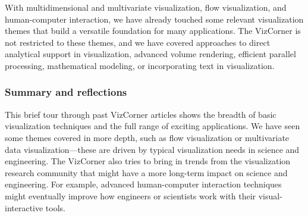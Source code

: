 \documentclass[10pt,journal,compsoc]{IEEEtran}
\begin{document}
With multidimensional and multivariate visualization, flow visualization, and human-computer interaction, we have already touched some relevant visualization themes that build a versatile foundation for many applications. The VizCorner is not restricted to these themes, and we have covered approaches to direct analytical support in visualization, advanced volume rendering, efficient parallel processing, mathematical modeling, or incorporating text in visualization.  %





\subsubsection*{Summary and reflections}

This brief tour through past VizCorner articles shows the breadth of basic visualization techniques and the full range of exciting applications. We have seen some themes covered in more depth, such as flow visualization or multivariate data visualization---these are driven by typical visualization needs in science and engineering. The VizCorner also tries to bring in trends from the visualization research community that might have a more long-term impact on science and engineering. For example, advanced human-computer interaction techniques might eventually improve how engineers or scientists work with their visual-interactive tools. 
\end{document}
